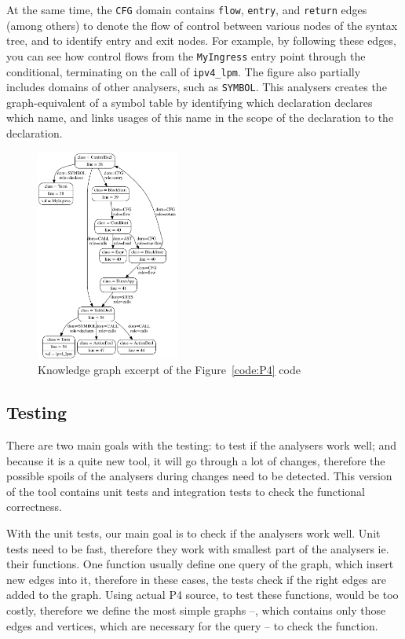 \documentclass[sigconf]{acmart}
\begin{document}
  At the same time, the \texttt{CFG} domain contains \texttt{flow}, \texttt{entry}, and \texttt{return} edges (among others) to denote the flow of control between various nodes of the syntax tree, and to identify entry and exit nodes. For example, by following these edges, you can see how control flows from the \texttt{MyIngress} entry point through the conditional, terminating on the call of \texttt{ipv4\_lpm}. 
The figure also partially includes domains of other analysers, such as \texttt{SYMBOL}. This analysers creates the graph-equivalent of a symbol table by identifying which declaration declares which name, and links usages of this name in the scope of the declaration to the declaration.

  \begin{figure}
    \includegraphics[width=0.42\textwidth]{figures/output.pdf}
    \caption{Knowledge graph excerpt of the Figure~\ref{code:P4} code}\label{fig:output}
  \end{figure}

	\subsection{Testing}
	There are two main goals with the testing: to test if the analysers work well; and because it is a quite new tool, it will go through a lot of changes, therefore the possible spoils of the analysers during changes need to be detected. This version of the tool contains unit tests and integration tests to check the functional correctness. 
	
	With the unit tests, our main goal is to check if the analysers work well. Unit tests need to be fast, therefore they work with smallest part of the analysers ie. their functions. One function usually define one query of the graph, which insert new edges into it, therefore in these cases, the tests check if the right edges are added to the graph. Using actual P4 source, to test these functions, would be too costly, therefore we define the most simple graphs --, which contains only those edges and vertices, which are necessary for the query -- to check the function.
	
\end{document}
